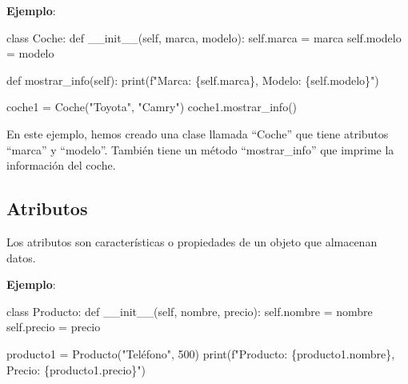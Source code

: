 \documentclass[
  a4paper,
  DIV=11,
  numbers=noendperiod,
  onepage,
  openany]{scrreprt}
\newenvironment{Shaded}{\begin{snugshade}}{\end{snugshade}}
\newcommand{\BuiltInTok}[1]{\textcolor[rgb]{0.00,0.23,0.31}{#1}}
\newcommand{\DecValTok}[1]{\textcolor[rgb]{0.68,0.00,0.00}{#1}}
\newcommand{\FunctionTok}[1]{\textcolor[rgb]{0.28,0.35,0.67}{#1}}
\newcommand{\KeywordTok}[1]{\textcolor[rgb]{0.00,0.23,0.31}{#1}}
\newcommand{\NormalTok}[1]{\textcolor[rgb]{0.00,0.23,0.31}{#1}}
\newcommand{\OperatorTok}[1]{\textcolor[rgb]{0.37,0.37,0.37}{#1}}
\newcommand{\SpecialCharTok}[1]{\textcolor[rgb]{0.37,0.37,0.37}{#1}}
\newcommand{\SpecialStringTok}[1]{\textcolor[rgb]{0.13,0.47,0.30}{#1}}
\newcommand{\StringTok}[1]{\textcolor[rgb]{0.13,0.47,0.30}{#1}}
\newcommand{\VariableTok}[1]{\textcolor[rgb]{0.07,0.07,0.07}{#1}}
\begin{document}
\textbf{Ejemplo}:

\begin{Shaded}
\begin{Highlighting}[]
\KeywordTok{class}\NormalTok{ Coche:}
    \KeywordTok{def} \FunctionTok{\_\_init\_\_}\NormalTok{(}\VariableTok{self}\NormalTok{, marca, modelo):}
        \VariableTok{self}\NormalTok{.marca }\OperatorTok{=}\NormalTok{ marca}
        \VariableTok{self}\NormalTok{.modelo }\OperatorTok{=}\NormalTok{ modelo}

    \KeywordTok{def}\NormalTok{ mostrar\_info(}\VariableTok{self}\NormalTok{):}
        \BuiltInTok{print}\NormalTok{(}\SpecialStringTok{f"Marca: }\SpecialCharTok{\{}\VariableTok{self}\SpecialCharTok{.}\NormalTok{marca}\SpecialCharTok{\}}\SpecialStringTok{, Modelo: }\SpecialCharTok{\{}\VariableTok{self}\SpecialCharTok{.}\NormalTok{modelo}\SpecialCharTok{\}}\SpecialStringTok{"}\NormalTok{)}

\NormalTok{coche1 }\OperatorTok{=}\NormalTok{ Coche(}\StringTok{"Toyota"}\NormalTok{, }\StringTok{"Camry"}\NormalTok{)}
\NormalTok{coche1.mostrar\_info()}
\end{Highlighting}
\end{Shaded}

En este ejemplo, hemos creado una clase llamada ``Coche'' que tiene
atributos ``marca'' y ``modelo''. También tiene un método
``mostrar\_info'' que imprime la información del coche.

\subsection{Atributos}\label{atributos}

Los atributos son características o propiedades de un objeto que
almacenan datos.

\textbf{Ejemplo}:

\begin{Shaded}
\begin{Highlighting}[]
\KeywordTok{class}\NormalTok{ Producto:}
    \KeywordTok{def} \FunctionTok{\_\_init\_\_}\NormalTok{(}\VariableTok{self}\NormalTok{, nombre, precio):}
        \VariableTok{self}\NormalTok{.nombre }\OperatorTok{=}\NormalTok{ nombre}
        \VariableTok{self}\NormalTok{.precio }\OperatorTok{=}\NormalTok{ precio}

\NormalTok{producto1 }\OperatorTok{=}\NormalTok{ Producto(}\StringTok{"Teléfono"}\NormalTok{, }\DecValTok{500}\NormalTok{)}
\BuiltInTok{print}\NormalTok{(}\SpecialStringTok{f"Producto: }\SpecialCharTok{\{}\NormalTok{producto1}\SpecialCharTok{.}\NormalTok{nombre}\SpecialCharTok{\}}\SpecialStringTok{, Precio: }\SpecialCharTok{\{}\NormalTok{producto1}\SpecialCharTok{.}\NormalTok{precio}\SpecialCharTok{\}}\SpecialStringTok{"}\NormalTok{)}
\end{Highlighting}
\end{Shaded}
\end{document}
